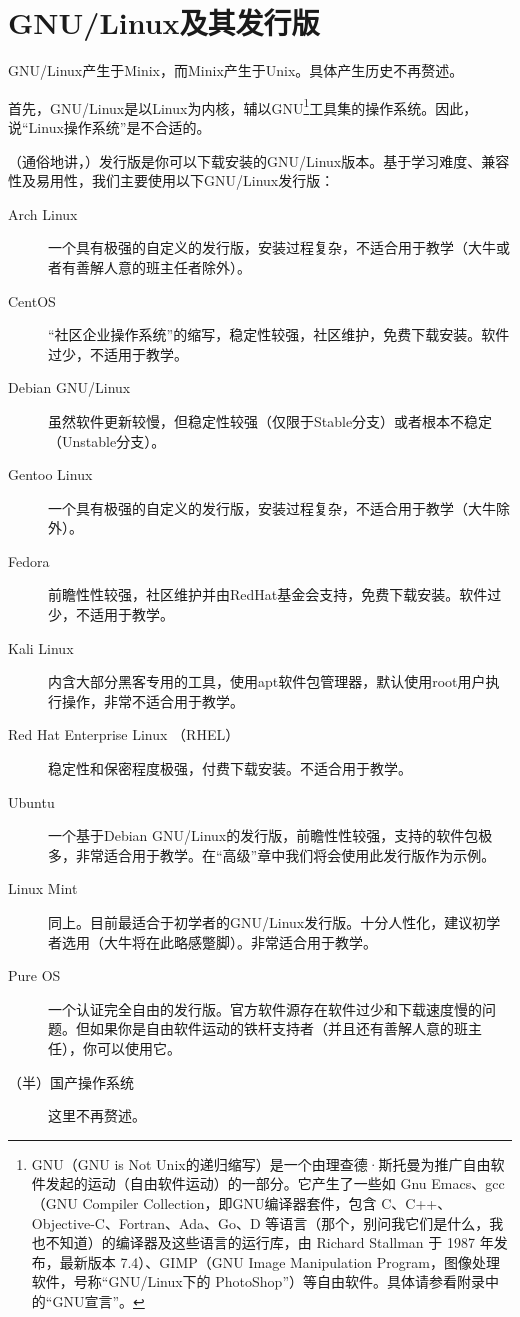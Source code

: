 \section{GNU/Linux及其发行版}
\label{sec:gnulinux} GNU/Linux产生于Minix，而Minix产生于Unix。具体产生历史不再赘述。\par
首先，GNU/Linux是以Linux为内核，辅以GNU\footnote{GNU（GNU is Not Unix的递归缩写）是一个由理查德·斯托曼为推广自由软件发起的运动（自由软件运动）的一部分。它产生了一些如 Gnu Emacs、gcc（GNU Compiler Collection，即GNU编译器套件，包含 C、C++、Objective-C、Fortran、Ada、Go、D 等语言（那个，别问我它们是什么，我也不知道）的编译器及这些语言的运行库，由 Richard Stallman 于 1987 年发布，最新版本 7.4）、GIMP（GNU Image Manipulation Program，图像处理软件，号称“GNU/Linux下的 PhotoShop”）等自由软件。具体请参看附录中的“GNU宣言”。}工具集的操作系统。因此，说“Linux操作系统”是不合适的。\par
（通俗地讲，）发行版是你可以下载安装的GNU/Linux版本。基于学习难度、兼容性及易用性，我们主要使用以下GNU/Linux发行版：
\begin{description}
	\item [Arch Linux] 一个具有极强的自定义的发行版，安装过程复杂，不适合用于教学（大牛或者有善解人意的班主任者除外）。
	\item [CentOS] “社区企业操作系统”的缩写，稳定性较强，社区维护，免费下载安装。软件过少，不适用于教学。
	\item [Debian GNU/Linux] 虽然软件更新较慢，但稳定性较强（仅限于Stable分支）或者根本不稳定（Unstable分支）。
	\item [Gentoo Linux] 一个具有极强的自定义的发行版，安装过程复杂，不适合用于教学（大牛除外）。
	\item [Fedora] 前瞻性性较强，社区维护并由RedHat基金会支持，免费下载安装。软件过少，不适用于教学。
	\item [Kali Linux] 内含大部分黑客专用的工具，使用apt软件包管理器，默认使用root用户执行操作，非常不适合用于教学。{\color{red}{警告！！！！如果你成功地使用Kali黑掉了不属于你并且拥有复杂日志系统的网络（并且你愚蠢到留下了自己的MAC地址还没有改变它），你极有可能入狱。}}
	\item [Red Hat Enterprise Linux （RHEL）] 稳定性和保密程度极强，付费下载安装。不适合用于教学。
	\item [Ubuntu] 一个基于Debian GNU/Linux的发行版，前瞻性性较强，支持的软件包极多，非常适合用于教学。在“高级”章中我们将会使用此发行版作为示例。
	\item [Linux Mint] 同上。目前最适合于初学者的GNU/Linux发行版。十分人性化，建议初学者选用（大牛将在此略感蹩脚）。非常适合用于教学。
	\item [Pure OS] 一个认证完全自由的发行版。官方软件源存在软件过少和下载速度慢的问题。但如果你是自由软件运动的铁杆支持者（并且还有善解人意的班主任），你可以使用它。
	\item [（半）国产操作系统]这里不再赘述。
\end{description}
